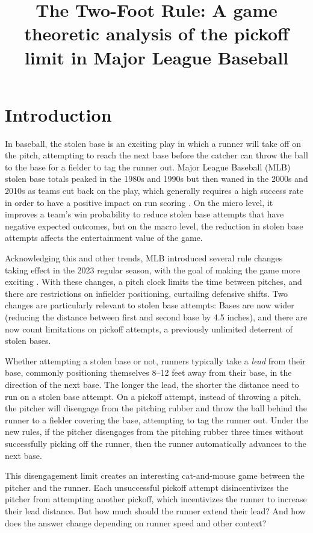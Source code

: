 \documentclass{article}
\title{The Two-Foot Rule: A game theoretic analysis of the pickoff limit in Major League Baseball}
\begin{document}
  \maketitle

  \section{Introduction}
  \label{sec:introduction}

    In baseball, the stolen base is an exciting play in which a runner will take off on the pitch, attempting to reach the next base before the catcher can throw the ball to the base for a fielder to tag the runner out. Major League Baseball (MLB) stolen base totals peaked in the 1980s and 1990s but then waned in the 2000s and 2010s as teams cut back on the play, which generally requires a high success rate in order to have a positive impact on run scoring \citep{tango_book_2007}. On the micro level, it improves a team's win probability to reduce stolen base attempts that have negative expected outcomes, but on the macro level, the reduction in stolen base attempts affects the entertainment value of the game.

    Acknowledging this and other trends, MLB introduced several rule changes taking effect in the 2023 regular season, with the goal of making the game more exciting \citep{castrovince_pitch_2023}. With these changes, a pitch clock limits the time between pitches, and there are restrictions on infielder positioning, curtailing defensive shifts. Two changes are particularly relevant to stolen base attempts: Bases are now wider (reducing the distance between first and second base by 4.5 inches), and there are now count limitations on pickoff attempts, a previously unlimited deterrent of stolen bases.
    
    Whether attempting a stolen base or not, runners typically take a {\it lead} from their base, commonly positioning themselves 8--12 feet away from their base, in the direction of the next base. The longer the lead, the shorter the distance need to run on a stolen base attempt. On a pickoff attempt, instead of throwing a pitch, the pitcher will disengage from the pitching rubber and throw the ball behind the runner to a fielder covering the base, attempting to tag the runner out. Under the new rules, if the pitcher disengages from the pitching rubber three times without successfully picking off the runner, then the runner automatically advances to the next base.

    This disengagement limit creates an interesting cat-and-mouse game between the pitcher and the runner. Each unsuccessful pickoff attempt disincentivizes the pitcher from attempting another pickoff, which incentivizes the runner to increase their lead distance. But how much should the runner extend their lead? And how does the answer change depending on runner speed and other context?
    
\end{document}
